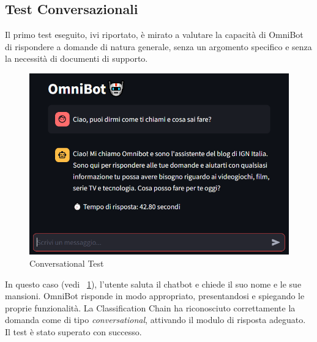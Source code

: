 \subsection{Test Conversazionali}
Il primo test eseguito, ivi riportato, è mirato a valutare la capacità di OmniBot di rispondere a domande di natura generale, senza un argomento specifico e senza la necessità di documenti di supporto.
\begin{figure}[!t]
    \centering
    \includegraphics[width=\textwidth]{Images/cap5/conversation.PNG}
    \caption{Conversational Test}
    \label{fig:conversation}
\end{figure}

In questo caso (vedi \figurename{~\ref{fig:conversation}}), l'utente saluta il chatbot e chiede il suo nome e le sue mansioni. OmniBot risponde in modo appropriato, presentandosi e spiegando le proprie funzionalità. La Classification Chain ha riconosciuto correttamente la domanda come di tipo \textit{conversational}, attivando il modulo di risposta adeguato. Il test è stato superato con successo.

